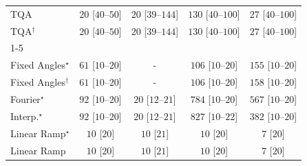 \begin{tabular}{l|cccc|}
TQA & {\cellcolor[HTML]{F5FBF2}} \color[HTML]{000000} $20$ [$40$--$50$] & {\cellcolor[HTML]{F5FBF2}} \color[HTML]{000000} $20$ [$39$--$144$] & {\cellcolor[HTML]{DFF3DA}} \color[HTML]{000000} $130$ [$40$--$100$] & {\cellcolor[HTML]{F4FBF1}} \color[HTML]{000000} $27$ [$40$--$100$] \\
TQA$^\dagger$ & {\cellcolor[HTML]{F5FBF2}} \color[HTML]{000000} $20$ [$40$--$50$] & {\cellcolor[HTML]{F5FBF2}} \color[HTML]{000000} $20$ [$39$--$144$] & {\cellcolor[HTML]{DFF3DA}} \color[HTML]{000000} $130$ [$40$--$100$] & {\cellcolor[HTML]{F4FBF1}} \color[HTML]{000000} $27$ [$40$--$100$] \\
\cline{1-5}
\multicolumn{5}{c}{\rule{0pt}{8pt}SV} \\
\midrule
Fixed Angles$^\star$ & {\cellcolor[HTML]{EEF8EA}} \color[HTML]{000000} $61$ [$10$--$20$] & {\cellcolor[HTML]{000000}} \color[HTML]{F1F1F1} {\cellcolor{white}} \color{black} - & {\cellcolor[HTML]{E6F5E1}} \color[HTML]{000000} $106$ [$10$--$20$] & {\cellcolor[HTML]{D8F0D2}} \color[HTML]{000000} $155$ [$10$--$20$] \\
Fixed Angles$^\dagger$ & {\cellcolor[HTML]{EEF8EA}} \color[HTML]{000000} $61$ [$10$--$20$] & {\cellcolor[HTML]{000000}} \color[HTML]{F1F1F1} {\cellcolor{white}} \color{black} - & {\cellcolor[HTML]{E6F5E1}} \color[HTML]{000000} $106$ [$10$--$20$] & {\cellcolor[HTML]{D7EFD1}} \color[HTML]{000000} $158$ [$10$--$20$] \\
Fourier$^\star$ & {\cellcolor[HTML]{E8F6E4}} \color[HTML]{000000} $92$ [$10$--$20$] & {\cellcolor[HTML]{F5FBF2}} \color[HTML]{000000} $20$ [$12$--$21$] & {\cellcolor[HTML]{005522}} \color[HTML]{F1F1F1} $784$ [$10$--$20$] & {\cellcolor[HTML]{339C52}} \color[HTML]{F1F1F1} $567$ [$10$--$20$] \\
Interp.$^\star$ & {\cellcolor[HTML]{E8F6E4}} \color[HTML]{000000} $92$ [$10$--$20$] & {\cellcolor[HTML]{F5FBF2}} \color[HTML]{000000} $20$ [$12$--$21$] & {\cellcolor[HTML]{00441B}} \color[HTML]{F1F1F1} $827$ [$10$--$22$] & {\cellcolor[HTML]{83CB82}} \color[HTML]{000000} $382$ [$10$--$20$] \\
Linear Ramp$^\star$ & {\cellcolor[HTML]{F7FCF5}} \color[HTML]{000000} $10$ [$20$] & {\cellcolor[HTML]{F7FCF5}} \color[HTML]{000000} $10$ [$21$] & {\cellcolor[HTML]{F7FCF5}} \color[HTML]{000000} $10$ [$20$] & {\cellcolor[HTML]{F7FCF5}} \color[HTML]{000000} $7$ [$20$] \\
Linear Ramp & {\cellcolor[HTML]{F7FCF5}} \color[HTML]{000000} $10$ [$20$] & {\cellcolor[HTML]{F7FCF5}} \color[HTML]{000000} $10$ [$21$] & {\cellcolor[HTML]{F7FCF5}} \color[HTML]{000000} $10$ [$20$] & {\cellcolor[HTML]{F7FCF5}} \color[HTML]{000000} $7$ [$20$] \\

\end{tabular}
